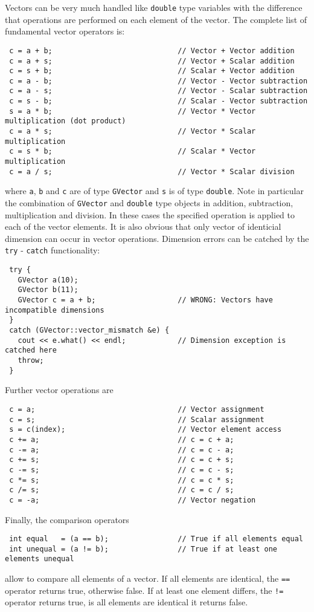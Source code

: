 \documentclass{article}[12pt,a4]
\begin{document}
Vectors can be very much handled like {\tt double} type variables
with the difference that operations are performed on each element of 
the vector.
The complete list of fundamental vector operators is:
\begin{verbatim}
 c = a + b;                             // Vector + Vector addition
 c = a + s;                             // Vector + Scalar addition
 c = s + b;                             // Scalar + Vector addition
 c = a - b;                             // Vector - Vector subtraction
 c = a - s;                             // Vector - Scalar subtraction
 c = s - b;                             // Scalar - Vector subtraction
 s = a * b;                             // Vector * Vector multiplication (dot product)
 c = a * s;                             // Vector * Scalar multiplication
 c = s * b;                             // Scalar * Vector multiplication
 c = a / s;                             // Vector * Scalar division
\end{verbatim}
where {\tt a}, {\tt b} and {\tt c} are of type {\tt GVector} and 
{\tt s} is of type {\tt double}.
Note in particular the combination of {\tt GVector} and {\tt double} 
type objects in addition, subtraction, multiplication and division.
In these cases the specified operation is applied to each of the 
vector elements.
It is also obvious that only vector of identicial dimension can occur 
in vector operations.
Dimension errors can be catched by the {\tt try} - {\tt catch} 
functionality:
\begin{verbatim}
 try {
   GVector a(10);                       
   GVector b(11);
   GVector c = a + b;                   // WRONG: Vectors have incompatible dimensions
 }
 catch (GVector::vector_mismatch &e) {
   cout << e.what() << endl;            // Dimension exception is catched here
   throw;
 }
\end{verbatim}
Further vector operations are
\begin{verbatim}
 c = a;                                 // Vector assignment
 c = s;                                 // Scalar assignment
 s = c(index);                          // Vector element access
 c += a;                                // c = c + a;
 c -= a;                                // c = c - a;
 c += s;                                // c = c + s;
 c -= s;                                // c = c - s;
 c *= s;                                // c = c * s;
 c /= s;                                // c = c / s;
 c = -a;                                // Vector negation
\end{verbatim}
Finally, the comparison operators
\begin{verbatim}
 int equal   = (a == b);                // True if all elements equal
 int unequal = (a != b);                // True if at least one elements unequal
\end{verbatim}
allow to compare all elements of a vector. If all elements are
identical, the {\tt ==} operator returns true, otherwise false.
If at least one element differs, the {\tt !=} operator returns true, 
is all elements are identical it returns false.
\end{document}
